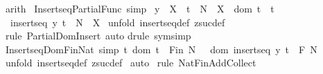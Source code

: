 \begin{isabellebody}
\isamarkupfalse%
\ arith\isanewline
{}\isamarkupfalse%
%
\endisatagproof
{\isafoldproof}%
%
\isadelimproof
%
\endisadelimproof
%
\isamarkuptrue%
\isamarkupfalse%
\ Insertseq{\isacharunderscore}Partial{\isacharunderscore}Func\ {\isacharbrackleft}simp{\isacharbrackright}{\isacharcolon}\ \isanewline
{\isachardoublequoteopen}{\isacharbrackleft}{\isacharbar}y\ {\isacharcolon}\ X\ {\isacharsemicolon}\ t\ {\isacharcolon}\ {\isacharparenleft}{\isacharpercent}N\ {\isacharminus}{\isacharbar}{\isacharminus}{\isachargreater}\ X{\isacharparenright}\ {\isacharsemicolon}\ {\isacharparenleft}{\isacharparenleft}dom\ t{\isacharparenright}\ {\isacharequal}\ {\isacharparenleft}{}{\isachardot}{\isachardot}{\isacharhash}t{\isacharparenright}{\isacharparenright}{\isacharbar}{\isacharbrackright}\ \ \isanewline
\ {\isacharequal}{\isacharequal}{\isachargreater}\ insertseq\ y\ t\ {\isacharcolon}\ {\isacharparenleft}{\isacharpercent}N\ {\isacharminus}{\isacharbar}{\isacharminus}{\isachargreater}\ X{\isacharparenright}{\isachardoublequoteclose}\isanewline
%
\isadelimproof
%
\endisadelimproof
%
\isatagproof
{}\isamarkupfalse%
\ {\isacharparenleft}unfold\ insertseq{\isacharunderscore}def\ zsuc{\isacharunderscore}def{\isacharparenright}\isanewline
{}\isamarkupfalse%
\ {\isacharparenleft}rule\ Partial{\isacharunderscore}Dom{\isacharunderscore}Insert{\isacharcomma}\ auto{\isacharparenright}\isanewline
{}\isamarkupfalse%
{\isacharparenleft}drule\ sym{\isacharcomma}simp{\isacharparenright}\isanewline
{}\isamarkupfalse%
%
\endisatagproof
{\isafoldproof}%
%
\isadelimproof
\isanewline
%
\endisadelimproof
\isanewline
\isanewline
{}\isamarkupfalse%
\ Insertseq{\isacharunderscore}Dom{\isacharunderscore}Fin{\isacharunderscore}Nat\ {\isacharbrackleft}simp{\isacharbrackright}{\isacharcolon}\ {\isachardoublequoteopen}{\isacharbang}{\isacharbang}t{\isachardot}\ dom\ t\ {\isacharcolon}\ Fin\ {\isacharpercent}N\ \ {\isacharequal}{\isacharequal}{\isachargreater}\ dom\ {\isacharparenleft}insertseq\ y\ t{\isacharparenright}\ {\isacharcolon}\ {\isacharpercent}F\ {\isacharpercent}N{\isachardoublequoteclose}\isanewline
%
\isadelimproof
%
\endisadelimproof
%
\isatagproof
{}\isamarkupfalse%
\ {\isacharparenleft}unfold\ insertseq{\isacharunderscore}def\ zsuc{\isacharunderscore}def{\isacharparenright}\isanewline
{}\isamarkupfalse%
\ auto\isanewline
{}\isamarkupfalse%
\ {\isacharparenleft}rule\ Nat{\isacharunderscore}Fin{\isacharunderscore}Add{\isacharunderscore}Collect{\isacharparenright}\isanewline

\end{isabellebody}
